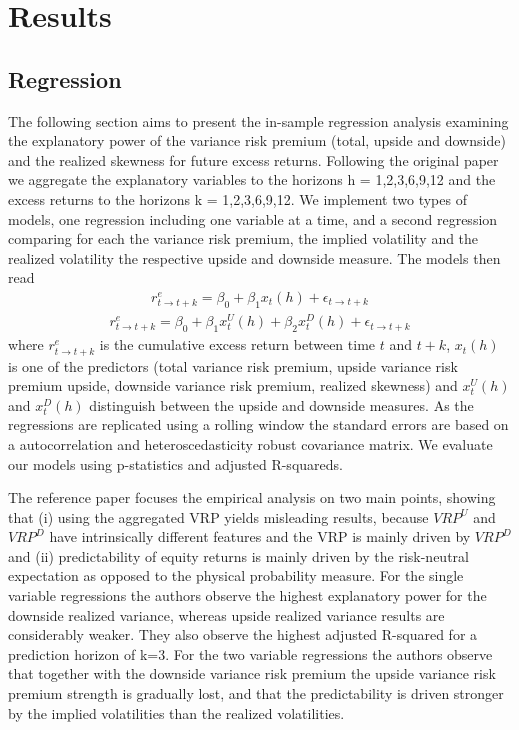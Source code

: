 
\section{Results}\label{sec:chapter4}

\subsection{Regression}

The following section aims to present the in-sample regression analysis examining the explanatory power of the variance risk premium (total, upside and downside) and the realized skewness for future excess returns. Following the original paper we aggregate the explanatory variables to the horizons h = 1,2,3,6,9,12 and the excess returns to the horizons k = 1,2,3,6,9,12. We implement two types of models, one regression including one variable at a time, and a second regression comparing for each the variance risk premium, the implied volatility and the realized volatility the respective upside and downside measure. The models then read
\begin{align}\label{eq:reg1}
r_{t \rightarrow t+k}^{e} = \beta_{0} + \beta_{1}x_{t}(h) + \epsilon_{t \rightarrow t+k}
\end{align}
\begin{align}\label{eq:reg2}
r_{t \rightarrow t+k}^{e} = \beta_{0} + \beta_{1}x_{t}^{U}(h) + \beta_{2}x_{t}^{D}(h) +  \epsilon_{t \rightarrow t+k}
\end{align}
where $r_{t \rightarrow t+k}^{e}$ is the cumulative excess return between time $t$ and $t+k$, $x_{t}(h)$ is one of the predictors (total variance risk premium, upside variance risk premium upside, downside variance risk premium, realized skewness) and $x_{t}^{U}(h)$ and $x_{t}^{D}(h)$ distinguish between the upside and downside measures. As the regressions are replicated using a rolling window the standard errors are based on a autocorrelation and heteroscedasticity robust covariance matrix. We evaluate our models using p-statistics and adjusted R-squareds.

\vspace{4mm}
The reference paper focuses the empirical analysis on two main points, showing that (i) using the aggregated VRP yields misleading results, because $VRP^{U}$ and $VRP^{D}$ have intrinsically different features and the VRP is mainly driven by $VRP^{D}$ and (ii) predictability of equity returns is mainly driven by the risk-neutral expectation as opposed to the physical probability measure. For the single variable regressions the authors observe the highest explanatory power for the downside realized variance, whereas upside realized variance results are considerably weaker. They also observe the highest adjusted R-squared for a prediction horizon of k=3. For the two variable regressions the authors observe that together with the downside variance risk premium the upside variance risk premium strength is gradually lost, and that the predictability is driven stronger by the implied volatilities than the realized volatilities.

